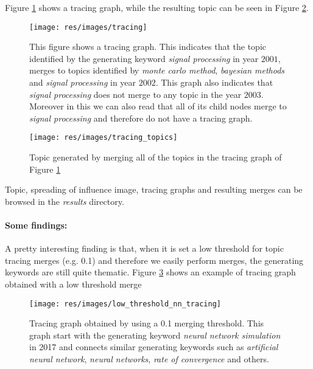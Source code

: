 \documentclass{article}
\begin{document}
Figure \ref{tracing} shows a tracing graph, while the resulting topic can be seen in Figure \ref{tracing_topics}.

\begin{figure}[H]
\texttt{[image: res/images/tracing]}
\centering
\caption{This figure shows a tracing graph. This indicates that the topic identified by the generating keyword \textit{signal processing} in year $2001$, merges to topics identified by \textit{monte carlo method}, \textit{bayesian methods} and \textit{signal processing} in year $2002$. This graph also indicates that \textit{signal processing} does not merge to any topic in the year $2003$. Moreover in this we can also read that all of its child nodes merge to \textit{signal processing} and therefore do not have a tracing graph.}
\label{tracing}
\end{figure}

\begin{figure}[H]
\texttt{[image: res/images/tracing\_topics]}
\centering
\caption{Topic generated by merging all of the topics in the tracing graph of Figure \ref{tracing}}
\label{tracing_topics}
\end{figure}

Topic, spreading of influence image, tracing graphs and resulting merges can be browsed in the \textit{results} directory.


\paragraph{Some findings:}
A pretty interesting finding is that, when it is set a low threshold for topic tracing merges (e.g. 0.1) and therefore we easily perform merges, the generating keywords are still quite thematic. Figure \ref{low_threshold_tracing_merge} shows an example of tracing graph obtained with a low threshold merge 
\begin{figure}[H]
\texttt{[image: res/images/low\_threshold\_nn\_tracing]}
\centering
\caption{Tracing graph obtained by using a 0.1 merging threshold. This graph start with the generating keyword \textit{neural network simulation} in 2017 and connects similar generating keywords such as \textit{artificial neural network}, \textit{neural networks}, \textit{rate of convergence} and others.}
\label{low_threshold_tracing_merge}
\end{figure}
\end{document}
